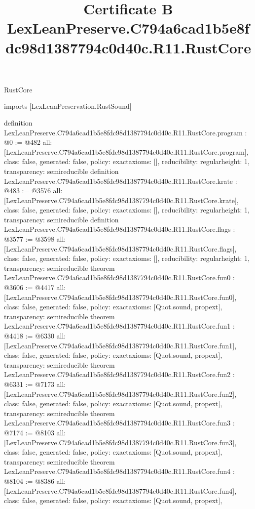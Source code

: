 \begin{lexlean}{RustCore}
\title{Certificate B LexLeanPreserve.C794a6cad1b5e8fdc98d1387794c0d40c.R11.RustCore}
\begin{coremodule}
imports [LexLeanPreservation.RustSound]

definition LexLeanPreserve.C794a6cad1b5e8fdc98d1387794c0d40c.R11.RustCore.program : @0 := @482 {
  all: [LexLeanPreserve.C794a6cad1b5e8fdc98d1387794c0d40c.R11.RustCore.program],
  class: false,
  generated: false,
  policy: exact{axioms: []},
  reducibility: regular{height: 1},
  transparency: semireducible
}
definition LexLeanPreserve.C794a6cad1b5e8fdc98d1387794c0d40c.R11.RustCore.krate : @483 := @3576 {
  all: [LexLeanPreserve.C794a6cad1b5e8fdc98d1387794c0d40c.R11.RustCore.krate],
  class: false,
  generated: false,
  policy: exact{axioms: []},
  reducibility: regular{height: 1},
  transparency: semireducible
}
definition LexLeanPreserve.C794a6cad1b5e8fdc98d1387794c0d40c.R11.RustCore.flags : @3577 := @3598 {
  all: [LexLeanPreserve.C794a6cad1b5e8fdc98d1387794c0d40c.R11.RustCore.flags],
  class: false,
  generated: false,
  policy: exact{axioms: []},
  reducibility: regular{height: 1},
  transparency: semireducible
}
theorem LexLeanPreserve.C794a6cad1b5e8fdc98d1387794c0d40c.R11.RustCore.fun0 : @3606 := @4417 {
  all: [LexLeanPreserve.C794a6cad1b5e8fdc98d1387794c0d40c.R11.RustCore.fun0],
  class: false,
  generated: false,
  policy: exact{axioms: [Quot.sound, propext]},
  transparency: semireducible
}
theorem LexLeanPreserve.C794a6cad1b5e8fdc98d1387794c0d40c.R11.RustCore.fun1 : @4418 := @6330 {
  all: [LexLeanPreserve.C794a6cad1b5e8fdc98d1387794c0d40c.R11.RustCore.fun1],
  class: false,
  generated: false,
  policy: exact{axioms: [Quot.sound, propext]},
  transparency: semireducible
}
theorem LexLeanPreserve.C794a6cad1b5e8fdc98d1387794c0d40c.R11.RustCore.fun2 : @6331 := @7173 {
  all: [LexLeanPreserve.C794a6cad1b5e8fdc98d1387794c0d40c.R11.RustCore.fun2],
  class: false,
  generated: false,
  policy: exact{axioms: [Quot.sound, propext]},
  transparency: semireducible
}
theorem LexLeanPreserve.C794a6cad1b5e8fdc98d1387794c0d40c.R11.RustCore.fun3 : @7174 := @8103 {
  all: [LexLeanPreserve.C794a6cad1b5e8fdc98d1387794c0d40c.R11.RustCore.fun3],
  class: false,
  generated: false,
  policy: exact{axioms: [Quot.sound, propext]},
  transparency: semireducible
}
theorem LexLeanPreserve.C794a6cad1b5e8fdc98d1387794c0d40c.R11.RustCore.fun4 : @8104 := @8386 {
  all: [LexLeanPreserve.C794a6cad1b5e8fdc98d1387794c0d40c.R11.RustCore.fun4],
  class: false,
  generated: false,
  policy: exact{axioms: [Quot.sound, propext]},
}
\end{coremodule}
\end{lexlean}
